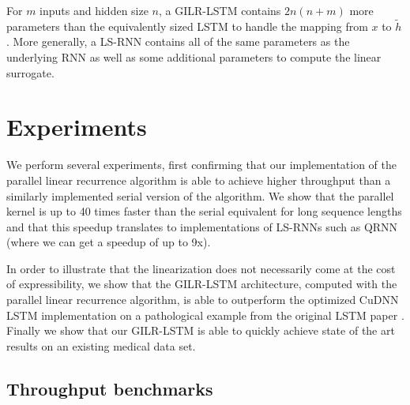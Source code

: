 \documentclass{article}
\begin{document}
For $m$ inputs and hidden size $n$, a GILR-LSTM contains $2n(n+m)$ more
parameters than the equivalently sized LSTM to handle the mapping from $x$ to
$\tilde{h}$. More generally, a LS-RNN contains all of the same parameters as the
underlying RNN as well as some additional parameters to compute the linear
surrogate.

\section{Experiments}
We perform several experiments, first confirming that our implementation of the
parallel linear recurrence algorithm is able to achieve higher throughput than a
similarly implemented serial version of the algorithm. We show that the parallel kernel
is up to 40 times faster than the serial equivalent for long sequence lengths and
that this speedup translates to implementations of LS-RNNs such as QRNN (where
we can get a speedup of up to 9x).

In order to illustrate that the linearization does not necessarily come at the
cost of expressibility, we show that the GILR-LSTM architecture, computed with
the parallel linear recurrence algorithm, is able to outperform the optimized CuDNN LSTM
implementation
on a pathological example from the original LSTM paper
\cite{hochreiter1997long}. Finally we show that our GILR-LSTM is able to
quickly achieve state of the art results on an existing medical data
set. 

\subsection{Throughput benchmarks}
\end{document}
